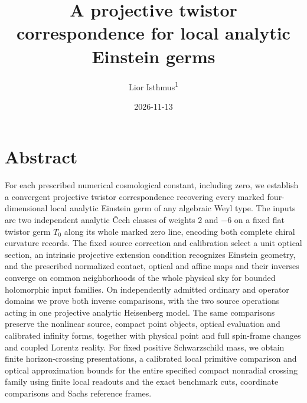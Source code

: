 \documentclass[
  english,
  11pt,
  reqno]{amsart}
\title{A projective twistor correspondence for local analytic Einstein
germs}
\author[Lior Isthmus]{Lior Isthmus\textsuperscript{1}}
\date{2026-11-13}
\begin{document}
\maketitle
{}
\setcounter{footnote}{1}


\protect{}\label{sec:gg-title}

\protect{}\label{a-projective-twistor-correspondence-for-local-analytic-einstein-germs}

\protect{}\label{sec:gg-abstract}

\section*{Abstract}\label{abstract}

For each prescribed numerical cosmological constant, including zero, we
establish a convergent projective twistor correspondence recovering
every marked four-dimensional local analytic Einstein germ of any
algebraic Weyl type. The inputs are two independent analytic Čech
classes of weights \(2\) and \(-6\) on a fixed flat twistor germ \(T_0\)
along its whole marked zero line, encoding both complete chiral
curvature records. The fixed source correction and calibration select a
unit optical section, an intrinsic projective extension condition
recognizes Einstein geometry, and the prescribed normalized contact,
optical and affine maps and their inverses converge on common
neighborhoods of the whole physical sky for bounded holomorphic input
families. On independently admitted ordinary and operator domains we
prove both inverse comparisons, with the two source operations acting in
one projective analytic Heisenberg model. The same comparisons preserve
the nonlinear source, compact point objects, optical evaluation and
calibrated infinity forms, together with physical point and full
spin-frame changes and coupled Lorentz reality. For fixed positive
Schwarzschild mass, we obtain finite horizon-crossing presentations, a
calibrated local primitive comparison and optical approximation bounds
for the entire specified compact nonradial crossing family using finite
local readouts and the exact benchmark cuts, coordinate comparisons and
Sachs reference frames.

\tableofcontents
\end{document}
